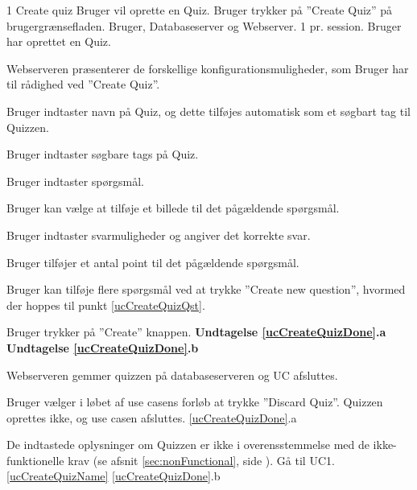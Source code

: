 
\uchead
	{1}
	{Create quiz}
	{Bruger vil oprette en Quiz.}
	{Bruger trykker på ''Create Quiz'' på brugergrænsefladen.}
	{Bruger, Databaseserver og Webserver.}
	{}
	{1 pr. session.}
	{Bruger har oprettet en Quiz.}

\item Webserveren præsenterer de forskellige konfigurationsmuligheder, som Bruger har til rådighed ved ''Create Quiz''.

\item \label{ucCreateQuizName} Bruger indtaster navn på Quiz, og dette tilføjes automatisk som et søgbart tag til Quizzen.

\item Bruger indtaster søgbare tags på Quiz.

\item \label{ucCreateQuizQst} Bruger indtaster spørgsmål.

\item Bruger kan vælge at tilføje et billede til det pågældende spørgsmål.

\item Bruger indtaster svarmuligheder og angiver det korrekte svar.

\item Bruger tilføjer et antal point til det pågældende spørgsmål.

\item Bruger kan tilføje flere spørgsmål ved at trykke ''Create new question'', hvormed der hoppes til punkt \ref{ucCreateQuizQst}.

\item \label{ucCreateQuizDone} Bruger trykker på ''Create'' knappen.
\textbf{Undtagelse \ref{ucCreateQuizDone}.a} \textbf{Undtagelse \ref{ucCreateQuizDone}.b}

\item \label{ucCreateQuizDB} Webserveren gemmer quizzen på databaseserveren og UC afsluttes.

\ucdescriptionend

\ucextension
	{Bruger vælger i løbet af use casens forløb at trykke ''Discard Quiz''.}
	{Quizzen oprettes ikke, og use casen afsluttes.}
	{\ref{ucCreateQuizDone}.a}
	
\ucextension
	{De indtastede oplysninger om Quizzen er ikke i overensstemmelse med de ikke-funktionelle krav (se afsnit \ref{sec:nonFunctional}, side \pageref{sec:nonFunctional}).}
	{Gå til UC1.\ref{ucCreateQuizName}}
	{\ref{ucCreateQuizDone}.b}
		
